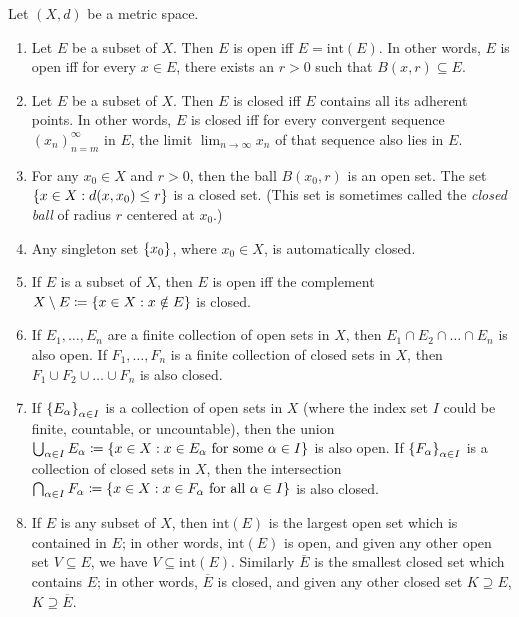 \begin{prop}\label{1.2.15}
  Let \((X, d)\) be a metric space.
  \begin{enumerate}
    \item Let \(E\) be a subset of \(X\).
          Then \(E\) is open iff \(E = \text{int}(E)\).
          In other words, \(E\) is open iff for every \(x \in E\), there exists an \(r > 0\) such that \(B(x, r) \subseteq E\).
    \item Let \(E\) be a subset of \(X\).
          Then \(E\) is closed iff \(E\) contains all its adherent points.
          In other words, \(E\) is closed iff for every convergent sequence \((x_n)_{n = m}^\infty\) in \(E\), the limit \(\lim_{n \to \infty} x_n\) of that sequence also lies in \(E\).
    \item For any \(x_0 \in X\) and \(r > 0\), then the ball \(B(x_0, r)\) is an open set.
          The set \(\left\lbrace x \in X : d(x, x_0) \leq r\right\rbrace\) is a closed set.
          (This set is sometimes called the \emph{closed ball} of radius \(r\) centered at \(x_0\).)
    \item Any singleton set \(\left\lbrace x_0\right\rbrace\), where \(x_0 \in X\), is automatically closed.
    \item If \(E\) is a subset of \(X\), then \(E\) is open iff the complement \(X \setminus E \coloneqq \left\lbrace x \in X : x \notin E\right\rbrace\) is closed.
    \item If \(E_1, \dots, E_n\) are a finite collection of open sets in \(X\), then \(E_1 \cap E_2 \cap \dots \cap E_n\) is also open.
          If \(F_1, \dots, F_n\) is a finite collection of closed sets in \(X\), then \(F_1 \cup F_2 \cup \dots \cup F_n\) is also closed.
    \item If \(\left\lbrace E_\alpha\right\rbrace_{\alpha \in I}\) is a collection of open sets in \(X\) (where the index set \(I\) could be finite, countable, or uncountable), then the union \(\bigcup_{\alpha \in I} E_\alpha \coloneqq \left\lbrace x \in X : x \in E_\alpha \text{ for some } \alpha \in I\right\rbrace\) is also open.
          If \(\left\lbrace F_\alpha\right\rbrace_{\alpha \in I}\) is a collection of closed sets in \(X\), then the intersection \(\bigcap_{\alpha \in I} F_\alpha \coloneqq \left\lbrace x \in X : x \in F_\alpha \text{ for all } \alpha \in I\right\rbrace\) is also closed.
    \item If \(E\) is any subset of \(X\), then \(\text{int}(E)\) is the largest open set which is contained in \(E\);
          in other words, \(\text{int}(E)\) is open, and given any other open set \(V \subseteq E\), we have \(V \subseteq \text{int}(E)\).
          Similarly \(\overline{E}\) is the smallest closed set which contains \(E\);
          in other words, \(\overline{E}\) is closed, and given any other closed set \(K \supseteq E\), \(K \supseteq \overline{E}\).
  \end{enumerate}
\end{prop}

